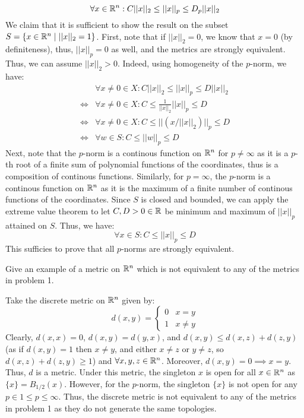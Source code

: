 \documentclass[12pt]{article}
\begin{document}
\begin{solu}
    \[ \forall x \in \mathbb R^n : C ||x||_2 \leq ||x||_p \leq D_p ||x||_2 \]
    We claim that it is sufficient to show the result on the subset $S = \{x \in \mathbb R^n \mid ||x||_2 = 1\}$. First, note that if $||x||_2 = 0$, we know that $x = 0$ (by definiteness), thus, $||x||_p = 0$ as well, and the metrics are strongly equivalent. Thus, we can assume $||x||_2 > 0$.
    Indeed, using homogeneity of the $p$-norm, we have:
    \begin{align*}
        &\forall x \neq 0 \in X: C ||x||_2 \leq ||x||_p \leq D ||x||_2 \\
        \iff &\forall x \neq 0 \in X: C \leq \frac{1}{||x||_2} ||x||_p \leq D \\
        \iff &\forall x \neq 0 \in X: C \leq  || (x/||x||_2)||_p \leq D \\
        \iff &\forall w \in S: C \leq ||w||_p \leq D
    \end{align*}
    Next, note that the $p$-norm is a continous function on $\mathbb R^n$ for $p \neq \infty$ as it is a $p$-th root of a finite sum of polynomial functions of the coordinates, thus is a composition of continous functions. Similarly, for $p = \infty$, the $p$-norm is a continous function on $\mathbb R^n$ as it is the maximum of a finite number of continous functions of the coordinates. Since $S$ is closed and bounded, we can apply the extreme value theorem to let $C, D > 0 \in \mathbb R$ be minimum and maximum of $||x||_p$ attained on $S$. Thus, we have:
    \[ \forall x \in S: C \leq ||x||_p \leq D \]
    This sufficies to prove that all $p$-norms are strongly equivalent.
\end{solu}

\newpage

\begin{problab}{2}
    Give an example of a metric on $\mathbb R^n$ which is not equivalent to any of the metrics in problem 1.
\end{problab}
\begin{solu}
    Take the discrete metric on $\mathbb R^n$ given by:
    \[ d(x,y) = \begin{cases}
        0 & x = y \\
        1 & x \neq y
    \end{cases} \]
    Clearly, $d(x,x) = 0$, $d(x,y) = d(y,x)$, and $d(x,y) \leq d(x,z) + d(z,y)$ (as if $d(x,y) = 1$ then $x \neq y$, and either $x \neq z$ or $y\neq z$, so $d(x,z)+d(z,y) \geq 1$) and $\forall x, y, z \in \mathbb R^n$. Moreover, $d(x,y) = 0 \implies x = y$. Thus, $d$ is a metric. \bbni
    Under this metric, the singleton ${x}$ is open for all $x \in \mathbb R^n$ as $\{x\} = B_{1/2}(x)$. However, for the $p$-norm, the singleton $\{x\}$ is not open for any $p \in 1\leq p \leq \infty$. Thus, the discrete metric is not equivalent to any of the metrics in problem 1 as they do not generate the same topologies.
\end{solu}
\end{document}
